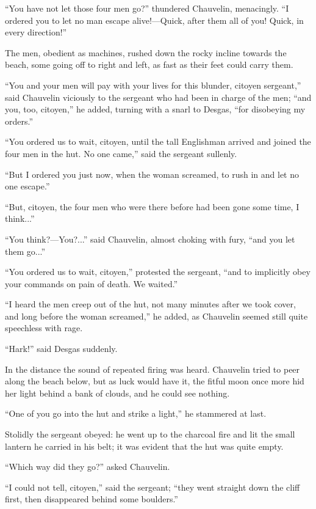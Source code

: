\documentclass[paper=a5,BCOR=7mm,twoside,DIV=calc,12pt,usegeometry,chapterprefix,endperiod,headings=big]{scrbook}
\begin{document}
\enquote{You have not let those four men go?} thundered Chauvelin, menacingly. \enquote{I ordered you to let no man escape alive!---Quick, after them all of you! Quick, in every direction!}

The men, obedient as machines, rushed down the rocky incline towards the beach, some going off to right and left, as fast as their feet could carry them.

\enquote{You and your men will pay with your lives for this blunder, citoyen sergeant,} said Chauvelin viciously to the sergeant who had been in charge of the men; \enquote{and you, too, citoyen,} he added, turning with a snarl to Desgas, \enquote{for disobeying my orders.}

\enquote{You ordered us to wait, citoyen, until the tall Englishman arrived and joined the four men in the hut. No one came,} said the sergeant sullenly.

\enquote{But I ordered you just now, when the woman screamed, to rush in and let no one escape.}

\enquote{But, citoyen, the four men who were there before had been gone some time, I think...}

\enquote{You think?---You?...} said Chauvelin, almost choking with fury, \enquote{and you let them go...}

\enquote{You ordered us to wait, citoyen,} protested the sergeant, \enquote{and to implicitly obey your commands on pain of death. We waited.}

\enquote{I heard the men creep out of the hut, not many minutes after we took cover, and long before the woman screamed,} he added, as Chauvelin seemed still quite speechless with rage.

\enquote{Hark!} said Desgas suddenly.

In the distance the sound of repeated firing was heard. Chauvelin tried to peer along the beach below, but as luck would have it, the fitful moon once more hid her light behind a bank of clouds, and he could see nothing.

\enquote{One of you go into the hut and strike a light,} he stammered at last.

Stolidly the sergeant obeyed: he went up to the charcoal fire and lit the small lantern he carried in his belt; it was evident that the hut was quite empty.

\enquote{Which way did they go?} asked Chauvelin.

\enquote{I could not tell, citoyen,} said the sergeant; \enquote{they went straight down the cliff first, then disappeared behind some boulders.}
\end{document}
